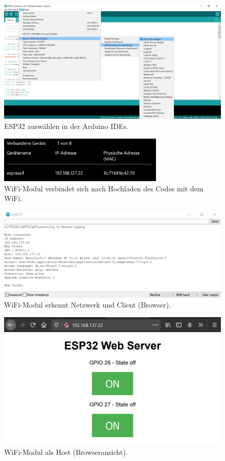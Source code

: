 \begin{figure}[H]
	\centering
	\includegraphics[width=\textwidth]{graphics/ESP32_Arduino_IDE}
	\caption{ESP32 auswählen in der Arduino IDEs.}
	\label{fig:ESP32_Arduino_IDE}
\end{figure}

\begin{figure}[H]
	\centering
	\includegraphics[width=0.7\textwidth]{graphics/ESP32_Verbundene_Geraete}
	\caption{WiFi-Modul verbindet sich nach Hochladen des Codes mit dem WiFi.}
	\label{fig:ESP32_Verbundene_Geraete}
\end{figure}

\begin{figure}[H]
	\centering
	\includegraphics[width=\textwidth]{graphics/ESP32_Serial_Monitor}
	\caption{WiFi-Modul erkennt Netzwerk und Client (Browser).}
	\label{fig:ESP32_Serial_Monitor}
\end{figure}

\begin{figure}[H]
	\centering
	\includegraphics[width=\textwidth]{graphics/ESP32_Webserver}
	\caption{WiFi-Modul als Host (Browseransicht).}
	\label{fig:ESP32_Webserver}
\end{figure}